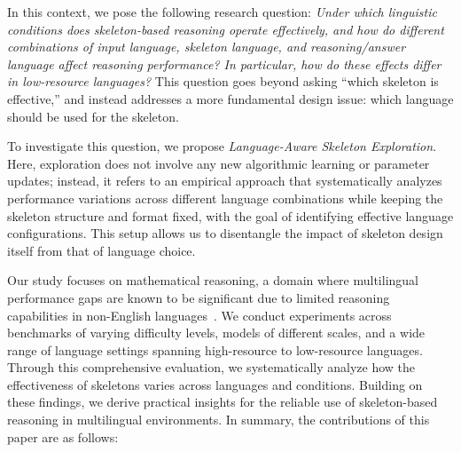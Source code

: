 In this context, we pose the following research question: \textit{Under which linguistic conditions does skeleton-based reasoning operate effectively, and how do different combinations of input language, skeleton language, and reasoning/answer language affect reasoning performance? In particular, how do these effects differ in low-resource languages?} This question goes beyond asking ``which skeleton is effective,'' and instead addresses a more fundamental design issue: which language should be used for the skeleton.

To investigate this question, we propose \textit{Language-Aware Skeleton Exploration}. Here, exploration does not involve any new algorithmic learning or parameter updates; instead, it refers to an empirical approach that systematically analyzes performance variations across different language combinations while keeping the skeleton structure and format fixed, with the goal of identifying effective language configurations. This setup allows us to disentangle the impact of skeleton design itself from that of language choice.

Our study focuses on mathematical reasoning, a domain where multilingual performance gaps are known to be significant due to limited reasoning capabilities in non-English languages~\citep{qi2025models}. We conduct experiments across benchmarks of varying difficulty levels, models of different scales, and a wide range of language settings spanning high-resource to low-resource languages. Through this comprehensive evaluation, we systematically analyze how the effectiveness of skeletons varies across languages and conditions. Building on these findings, we derive practical insights for the reliable use of skeleton-based reasoning in multilingual environments. In summary, the contributions of this paper are as follows:

